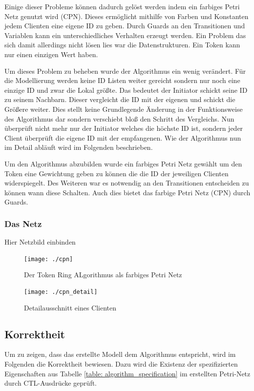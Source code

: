 Einige dieser Probleme können dadurch gelöst werden indem ein farbiges Petri Netz genutzt wird (CPN). Dieses ermöglicht mithilfe von Farben und Konstanten jedem Clienten eine eigene ID zu geben. Durch Guards an den Transitionen und Variablen kann ein unterschiedliches Verhalten erzeugt werden. Ein Problem das sich damit allerdings nicht lösen lies war die Datenstrukturen. Ein Token kann nur einen einzigen Wert haben.

Um dieses Problem zu beheben wurde der Algorithmus ein wenig verändert. Für die Modellierung werden keine ID Listen weiter gereicht sondern nur noch eine einzige ID und zwar die Lokal größte. Das bedeutet der Initiator schickt seine ID zu seinem Nachbarn. Dieser vergleicht die ID mit der eigenen und schickt die Größere weiter. Dies stellt keine Grundlegende Änderung in der Funktionsweise des Algorithmus dar sondern verschiebt bloß den Schritt des Vergleichs. Nun überprüft nicht mehr nur der Initiator welches die höchste ID ist, sondern jeder Client überprüft die eigene ID mit der empfangenen. Wie der Algorithmus nun im Detail abläuft wird im Folgenden beschrieben.

Um den Algorithmus abzubilden wurde ein farbiges Petri Netz gewählt um den Token eine Gewichtung geben zu können die die ID der jeweiligen Clienten widerspiegelt. Des Weiteren war es notwendig an den Transitionen entscheiden zu können wann diese Schalten. Auch dies bietet das farbige Petri Netz (CPN) durch Guards.



\subsubsection{Das Netz}
Hier Netzbild einbinden
\begin{figure}[H]
\centering
\texttt{[image: ./cpn]}
\caption{Der Token Ring ALgorithmus als farbiges Petri Netz}
\label{fig:cpn}
\end{figure}

\begin{figure}[H]
\centering
\texttt{[image: ./cpn\_detail]}
\caption{Detailausschnitt eines Clienten}
\label{fig:cpn_detail}
\end{figure}



\subsection{Korrektheit}
Um zu zeigen, dass das erstellte Modell dem Algorithmus entspricht, wird im Folgenden die Korrektheit bewiesen. Dazu wird die Existenz der spezifizierten Eigenschaften aus Tabelle \ref{table: algorithm_specification} im erstellten Petri-Netz durch CTL-Ausdrücke geprüft.

